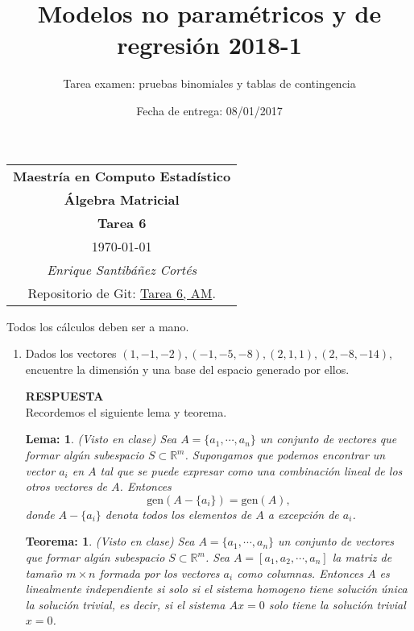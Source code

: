 \documentclass[11pt,letterpaper]{article}
\title{Modelos no paramétricos y de regresión 2018-1}
\author{Tarea examen: pruebas binomiales y tablas de contingencia}
\date{Fecha de entrega: 08/01/2017}
\newcommand{\mR}{\mathbb{R}}
\newcommand{\res}{\textbf{RESPUESTA}\\}
\newcommand{\gen}{\text{gen}}
\newtheorem{thmt}{Teorema:}
\newtheorem{thml}{Lema:}
\begin{document}
\begin{table}[ht]
\centering
\begin{tabular}{c}
\textbf{Maestría en Computo Estadístico}\\
\textbf{Álgebra Matricial} \\
\textbf{Tarea 6}\\
\today \\
\emph{Enrique Santibáñez Cortés}\\
Repositorio de Git: \href{https://github.com/Enriquesec/Algebra_matricial/tree/master/tareas/Tarea_6}{Tarea 6, AM}.
\end{tabular}
\end{table}
Todos los cálculos deben ser a mano.
\begin{enumerate}
\item Dados los vectores $(1, -1, -2), (-1, -5, -8), (2, 1, 1), (2, -8, -14)$, encuentre la dimensión y una base del espacio generado por ellos.

\res Recordemos el siguiente lema y teorema.
\begin{framed}
    \begin{thml} \label{espacio_generado_igua}
	(Visto en clase) Sea $A=\{a_1,\cdots,a_n\}$ un conjunto de vectores que formar algún subespacio $S\subset \mR^m$. Supongamos que podemos encontrar un vector $a_i$ en $A$ tal que se puede expresar como una combinación lineal de los otros vectores de $A$. Entonces $$\gen(A-\{a_i\})=\gen(A),$$ donde $A-\{a_i\}$ denota todos los elementos de $A$ a excepción de $a_i$.
    \end{thml}
\end{framed}
\begin{framed}
    \begin{thmt} \label{vectores_iid}
	(Visto en clase) Sea $A=\{a_1,\cdots,a_n\}$ un conjunto de vectores que formar algún subespacio $S\subset \mR^m$. Sea $A=[a_1,a_2,\cdots, a_n]$ la matriz de tamaño $m\times n$ formada por los vectores $a_i$ como columnas. Entonces $A$ es linealmente independiente si solo si el sistema homogeno tiene solución única la solución trivial, es decir, si el sistema $Ax=0$ solo tiene la solución trivial $x=0$.
    \end{thmt}
\end{framed}


\end{enumerate}
\end{document}

